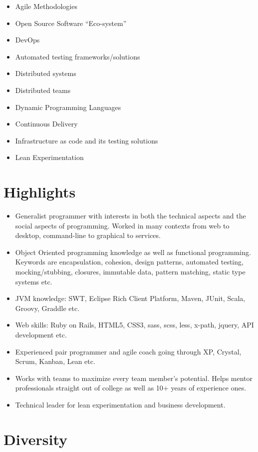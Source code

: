 \documentclass[letter,10pt]{article}
\begin{document}
\begin{itemize}
\item Agile Methodologies
\item Open Source Software ``Eco-system''
\item DevOps
\item Automated testing frameworks/solutions
\item Distributed systems
\item Distributed teams
\item Dynamic Programming Languages
\item Continuous Delivery
\item Infrastructure as code and its testing solutions
\item Lean Experimentation
\end{itemize}

\section{Highlights}

\begin{itemize}
\item Generalist programmer with interests in both the technical
  aspects and the social aspects of programming. Worked in many contexts from web to desktop, command-line to graphical to services.
\item Object Oriented programming knowledge as well as functional programming. Keywords are encapsulation, cohesion, design patterns, automated testing, mocking/stubbing, closures, immutable data, pattern matching, static type systems etc.
\item JVM knowledge: SWT, Eclipse Rich Client Platform, Maven, JUnit, Scala, Groovy, Graddle etc.
\item Web skills: Ruby on Rails, HTML5, CSS3, sass, scss, less, x-path, jquery, API development etc.
\item Experienced pair programmer and agile coach going through XP, Crystal, Scrum, Kanban, Lean etc.
\item Works with teams to maximize every team member's potential. Helps mentor professionals straight out of college as well as 10+ years of experience ones.
\item Technical leader for lean experimentation and business development.
\end{itemize}

\section{Diversity}
\end{document}
